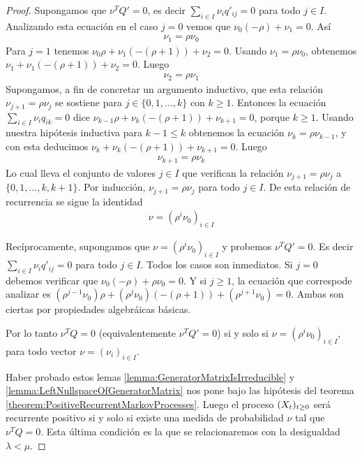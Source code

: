 \documentclass{article}
\theoremstyle{definition}
\begin{document}
\begin{proof}
Supongamos que \(\nu^T Q' = 0\), es decir \(\sum_{i \in I} \nu_i q'_{i j} =0\) para todo \(j \in I\).
Analizando esta ecuación en el caso \(j = 0\) vemos que \(\nu_0 (- \rho) + \nu_1 = 0\).
Así
\begin{align}
	\nu_1 = \rho \nu_0
\end{align}
Para \(j = 1\) tenemos \(\nu_0 \rho + \nu_1 (- (\rho + 1)) + \nu_2 = 0\).
Usando \(\nu_1 = \rho \nu_0\), obtenemos \(\nu_1 + \nu_1 (- (\rho + 1)) + \nu_2 = 0\).
Luego
\begin{align}
	\nu_2 = \rho \nu_1
\end{align}
Supongamos, a fin de concretar un argumento inductivo, que esta relación \(\nu_{j + 1} = \rho \nu_j\) se sostiene para \(j \in \{0, 1, \dots, k\}\) con \(k \geq 1\).
Entonces la ecuación \(\sum_{i \in I} \nu_i q_{i k} = 0\) dice \(\nu_{k - 1} \rho + \nu_k (- (\rho + 1)) + \nu_{k + 1} = 0\), porque \(k \geq 1\).
Usando nuestra hipótesis inductiva para \(k - 1 \leq k\) obtenemos la ecuación \(\nu_k = \rho \nu_{k - 1}\), y con esta deducimos \(\nu_k + \nu_k (- (\rho + 1)) + \nu_{k + 1} = 0\).
Luego
\begin{align}
	\nu_{k + 1} = \rho \nu_k
\end{align}
Lo cual lleva el conjunto de valores \(j \in I\) que verifican la relación \(\nu_{j + 1} = \rho \nu_j\) a \(\{0, 1, \dots, k, k + 1\}\).
Por inducción, \(\nu_{j + 1} = \rho \nu_j\) para todo \(j \in I\).
De esta relación de recurrencia se sigue la identidad 
\begin{align}
	\nu = (\rho^i \nu_0)_{i \in I}
\end{align}

Recíprocamente, supongamos que \(\nu = (\rho^i \nu_0)_{i \in I}\) y probemos \(\nu^T Q' = 0\).
Es decir \(\sum_{i \in I} \nu_i q'_{i j} = 0\) para todo \(j \in I\).
Todos los casos son inmediatos.
Si \(j = 0\) debemos verificar que \(\nu_0 (- \rho) + \rho \nu_0 = 0\).
Y si \(j \geq 1\), la ecuación que correspode analizar es \((\rho^{j - 1} \nu_0) \rho + (\rho^j \nu_0) (- (\rho + 1)) + (\rho^{j + 1} \nu_0) = 0\).
Ambas son ciertas por propiedades algebráicas básicas.

Por lo tanto \(\nu^T Q = 0\) (equivalentemente \(\nu^T Q' = 0\)) si y solo si \(\nu = (\rho^i \nu_0)_{i \in I}\), para todo vector \(\nu = (\nu_i)_{i \in I}\).

\medskip
Haber probado estos lemas \ref{lemma:GeneratorMatrixIsIrreducible} y \ref{lemma:LeftNullspaceOfGeneratorMatrix} nos pone bajo las hipótesis del teorema \ref{theorem:PositiveRecurrentMarkovProcesses}.
Luego el proceso \((X_t)_{t \geq 0}\) será recurrente positivo si y solo si existe una medida de probabilidad \(\nu\) tal que \(\nu^T Q = 0\).
Esta última condición es la que se relacionaremos con la desigualdad \(\lambda < \mu\).


\end{proof}
\end{document}
